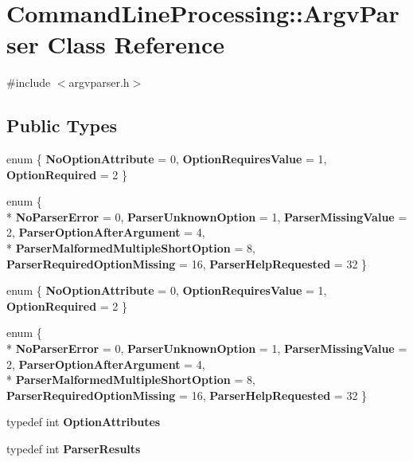 \hypertarget{class_command_line_processing_1_1_argv_parser}{\section{Command\-Line\-Processing\-:\-:Argv\-Parser Class Reference}
\label{class_command_line_processing_1_1_argv_parser}
}


{\ttfamily \#include $<$argvparser.\-h$>$}

\subsection*{Public Types}
\begin{DoxyCompactItemize}
\item 
enum \{ {\bfseries No\-Option\-Attribute} = 0, 
{\bfseries Option\-Requires\-Value} = 1, 
{\bfseries Option\-Required} = 2
 \}
\item 
enum \{ \\*
{\bfseries No\-Parser\-Error} = 0, 
{\bfseries Parser\-Unknown\-Option} = 1, 
{\bfseries Parser\-Missing\-Value} = 2, 
{\bfseries Parser\-Option\-After\-Argument} = 4, 
\\*
{\bfseries Parser\-Malformed\-Multiple\-Short\-Option} = 8, 
{\bfseries Parser\-Required\-Option\-Missing} = 16, 
{\bfseries Parser\-Help\-Requested} = 32
 \}
\item 
enum \{ {\bfseries No\-Option\-Attribute} = 0, 
{\bfseries Option\-Requires\-Value} = 1, 
{\bfseries Option\-Required} = 2
 \}
\item 
enum \{ \\*
{\bfseries No\-Parser\-Error} = 0, 
{\bfseries Parser\-Unknown\-Option} = 1, 
{\bfseries Parser\-Missing\-Value} = 2, 
{\bfseries Parser\-Option\-After\-Argument} = 4, 
\\*
{\bfseries Parser\-Malformed\-Multiple\-Short\-Option} = 8, 
{\bfseries Parser\-Required\-Option\-Missing} = 16, 
{\bfseries Parser\-Help\-Requested} = 32
 \}
\item 
\hypertarget{class_command_line_processing_1_1_argv_parser_a09e98f88e306ec9a2fb780f05981a857}{typedef int {\bfseries Option\-Attributes}}\label{class_command_line_processing_1_1_argv_parser_a09e98f88e306ec9a2fb780f05981a857}

\item 
\hypertarget{class_command_line_processing_1_1_argv_parser_a2b812f40e18434aa89eb826ff06535ce}{typedef int {\bfseries Parser\-Results}}\label{class_command_line_processing_1_1_argv_parser_a2b812f40e18434aa89eb826ff06535ce}


\end{DoxyCompactItemize}
